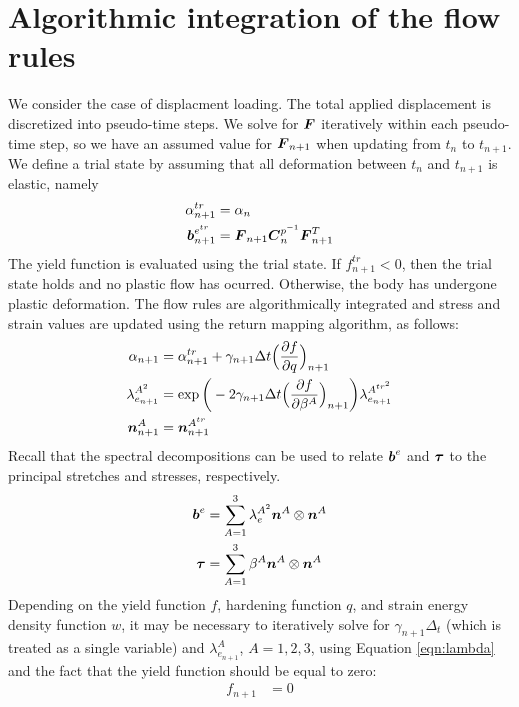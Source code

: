 \documentclass[10pt]{article}
\begin{document}
\section{Algorithmic integration of the flow rules}
We consider the case of displacment loading. The total applied displacement is discretized into pseudo-time steps. We solve for $\mbox{\boldmath$ F$}$ iteratively within each pseudo-time step, so we have an assumed value for $\mbox{\boldmath$ F$}_{n+1}$ when updating from $t_n$ to $t_{n+1}$. We define a trial state by assuming that all deformation between $t_n$ and $t_{n+1}$ is elastic, namely
\begin{align}
\alpha^{tr}_{n+1} &= \alpha_n\\
\mbox{\boldmath$ b$}^{e^{tr}}_{n+1} &= \mbox{\boldmath$ F$}_{n+1}\mbox{\boldmath$ C$}^{p^{-1}}_n\mbox{\boldmath$ F$}_{n+1}^T
\end{align}
The yield function is evaluated using the trial state. If $f_{n+1}^{tr} < 0$, then the trial state holds and no plastic flow has ocurred. Otherwise, the body has undergone plastic deformation. The flow rules are algorithmically integrated and stress and strain values are updated using the return mapping algorithm, as follows:
\begin{align}
\alpha_{n+1} &= \alpha_{n+1}^{tr} + \gamma_{n+1}\Delta t
\Big(\frac{\partial f}{\partial q}\Big)_{n+1}\\
\lambda_{e_{n+1}}^{A^2} &= \exp\bigg(-2\gamma_{n+1}\Delta t
\Big(\frac{\partial f}{\partial \beta^A}\Big)_{n+1}\bigg)
\label{eqn:lambda}
\lambda_{e_{n+1}}^{A^{{tr}^2}}\\
\mbox{\boldmath$ n$}^A_{n+1} &= \mbox{\boldmath$ n$}^{A^{tr}}_{n+1}
\end{align}
Recall that the spectral decompositions can be used to relate $\mbox{\boldmath$ b$}^e$ and $\mbox{\boldmath$\tau$}$ to the principal stretches and stresses, respectively.
\begin{align}
\mbox{\boldmath$ b$}^e &= \sum_{A=1}^3 \lambda_e^{A^2} \mbox{\boldmath$ n$}^A \otimes \mbox{\boldmath$ n$}^A\\
\mbox{\boldmath$\tau$} &= \sum_{A=1}^3 \beta^A \mbox{\boldmath$ n$}^A \otimes \mbox{\boldmath$ n$}^A
\end{align}
Depending on the yield function $f$, hardening function $q$, and strain energy density function $w$, it may be necessary to iteratively solve for $\gamma_{n+1} \Delta_t$ (which is treated as a single variable) and $\lambda^A_{e_{n+1}}$, $A=1,2,3$, using Equation \ref{eqn:lambda} and the fact that the yield function should be equal to zero:
\begin{align}
f_{n+1} &= 0
\end{align}
\end{document}
